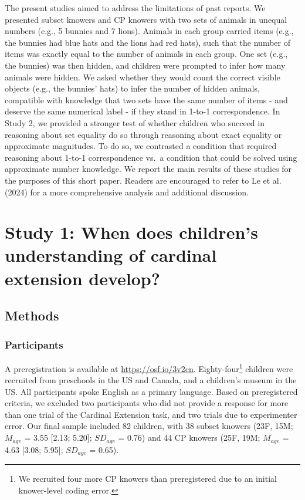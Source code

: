 \documentclass[10pt, letterpaper]{article}
\begin{document}
The present studies aimed to address the limitations of past reports. We
presented subset knowers and CP knowers with two sets of animals in
unequal numbers (e.g., 5 bunnies and 7 lions). Animals in each group
carried items (e.g., the bunnies had blue hats and the lions had red
hats), such that the number of items was exactly equal to the number of
animals in each group. One set (e.g., the bunnies) was then hidden, and
children were prompted to infer how many animals were hidden. We asked
whether they would count the correct visible objects (e.g., the bunnies'
hats) to infer the number of hidden animals, compatible with knowledge
that two sets have the same number of items - and deserve the same
numerical label - if they stand in 1-to-1 correspondence. In Study 2, we
provided a stronger test of whether children who succeed in reasoning
about set equality do so through reasoning about exact equality or
approximate magnitudes. To do so, we contrasted a condition that
required reasoning about 1-to-1 correspondence vs.~a condition that
could be solved using approximate number knowledge. We report the main
results of these studies for the purposes of this short paper. Readers
are encouraged to refer to Le et al. (2024) for a more comprehensive
analysis and additional discussion.

\hypertarget{study-1-when-does-childrens-understanding-of-cardinal-extension-develop}{%
\section{Study 1: When does children's understanding of cardinal
extension
develop?}\label{study-1-when-does-childrens-understanding-of-cardinal-extension-develop}}

\hypertarget{methods}{%
\subsection{Methods}\label{methods}}

\hypertarget{participants}{%
\subsubsection{Participants}\label{participants}}

A preregistration is available at \url{https://osf.io/3v2cn}.
Eighty-four\footnote{We recruited four more CP knowers than
  preregistered due to an initial knower-level coding error.} children
were recruited from preschools in the US and Canada, and a children's
museum in the US. All participants spoke English as a primary language.
Based on preregistered criteria, we excluded two participants who did
not provide a response for more than one trial of the Cardinal Extension
task, and two trials due to experimenter error. Our final sample
included 82 children, with 38 subset knowers (23F, 15M; \(M_{age}\) =
3.55 {[}2.13; 5.20{]}; \(SD_{age}\) = 0.76) and 44 CP knowers (25F, 19M;
\(M_{age}\) = 4.63 {[}3.08; 5.95{]}; \(SD_{age}\) = 0.65).
\end{document}
